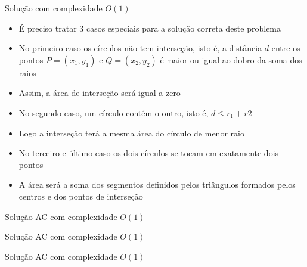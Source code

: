 \begin{frame}[fragile]{Solução com complexidade $O(1)$}

    \begin{itemize}
        \item É preciso tratar 3 casos especiais para a solução correta deste problema

        \item No primeiro caso os círculos não tem interseção, isto é, a distância $d$ entre os
            pontos $P = (x_1, y_1)$ e $Q = (x_2, y_2)$ é maior ou igual ao dobro da soma dos
            raios

        \item Assim, a área de interseção será igual a zero

        \item No segundo caso, um círculo contém o outro, isto é, $d \leq r_1 + r2$

        \item Logo a interseção terá a mesma área do círculo de menor raio

        \item No terceiro e último caso os dois círculos se tocam em exatamente dois pontos

        \item A área será a soma dos segmentos definidos pelos triângulos formados pelos
            centros e dos pontos de interseção
    \end{itemize}

\end{frame}

\begin{frame}[fragile]{Solução AC com complexidade $O(1)$}
\end{frame}

\begin{frame}[fragile]{Solução AC com complexidade $O(1)$}
\end{frame}

\begin{frame}[fragile]{Solução AC com complexidade $O(1)$}
\end{frame}
